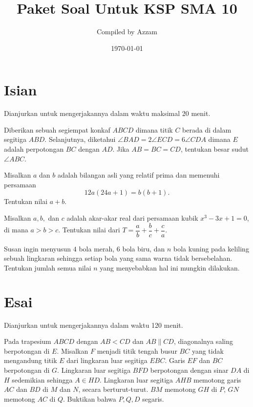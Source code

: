 \documentclass[11pt]{scrartcl}
\begin{document}
	\title{Paket Soal Untuk KSP SMA 10} %
	\date{\today}
	\author{Compiled by Azzam}
	\maketitle
	
	\section{Isian}
	Dianjurkan untuk mengerjakannya dalam waktu maksimal 20 menit.
	\begin{soalbaru} 
			
		Diberikan sebuah segiempat konkaf $ABCD$ dimana titik $C$ berada di dalam segitiga $ABD$. Selanjutnya, diketahui $\angle BAD = 2\angle ECD = 6\angle CDA$ dimana $E$ adalah perpotongan $BC$ dengan $AD$. Jika $AB=BC=CD$, tentukan besar sudut $\angle ABC$.
				\end{soalbaru}
				
	\begin{soalbaru}
	Misalkan $a$ dan $b$ adalah bilangan asli yang relatif prima dan memenuhi persamaan
	$$12a(24a+1)=b(b+1).$$
	Tentukan nilai $a+b$.
	\end{soalbaru}
	
	\begin{soalbaru}
	Misalkan $a,b,$ dan $c$ adalah akar-akar real dari persamaan kubik $x^3-3x+1=0$, di mana $a>b>c$. Tentukan nilai dari
	$T = \dfrac{a}{b}+\dfrac{b}{c}+\dfrac{c}{a}.$
	\end{soalbaru}
	
	\begin{soalbaru}
	Susan ingin menyusun $4$ bola merah, 6 bola biru, dan $n$ bola kuning pada keliling sebuah lingkaran sehingga setiap bola yang sama warna tidak bersebelahan. Tentukan jumlah semua nilai $n$ yang menyebabkan hal ini mungkin dilakukan.
	\end{soalbaru}
	
	\newpage
	\section{Esai}
	Dianjurkan untuk mengerjakannya dalam waktu 120 menit.
	
	
	
		
		\begin{soalbaru}
				Pada trapesium $ABCD$ dengan $AB<CD$ dan $AB \parallel CD$, diagonalnya saling berpotongan di $E$. Misalkan $F$ menjadi titik tengah busur $BC$ yang tidak mengandung titik $E$ dari lingkaran luar segitiga $EBC$. Garis $EF$ dan $BC$ berpotongan di $G$. Lingkaran luar segitiga $BFD$ berpotongan dengan sinar $DA$ di $H$ sedemikian sehingga $A \in HD$. Lingkaran luar segitiga $AHB$ memotong garis $AC$ dan $BD$ di $M$ dan $N$, secara berturut-turut. $BM$ memotong $GH$ di $P$, $GN$ memotong $AC$ di $Q$. Buktikan bahwa $P, Q, D$ segaris.
			\end{soalbaru}
\end{document}
